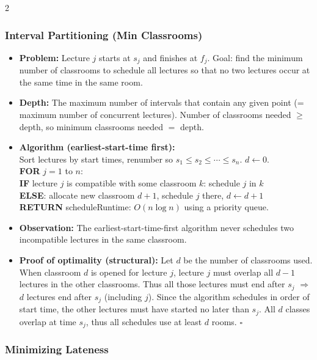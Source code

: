 \documentclass[9pt]{article}
\begin{document}
\begin{multicols}{2}
\subsubsection*{Interval Partitioning (Min Classrooms)}

\begin{itemize}
  \item \textbf{Problem:} Lecture $j$ starts at $s_j$ and finishes at $f_j$. Goal: find the minimum number of classrooms to schedule all lectures so that no two lectures occur at the same time in the same room.
  \item \textbf{Depth:} The maximum number of intervals that contain any given point (= maximum number of concurrent lectures). Number of classrooms needed $\ge$ depth, so minimum classrooms needed $=$ depth.
  \item \textbf{Algorithm (earliest-start-time first):}\\
  Sort lectures by start times, renumber so $s_1\le s_2\le\cdots\le s_n$. $d\leftarrow0$.\\
  \textbf{FOR} $j=1$ to $n$:\\
  \hspace*{8pt}\textbf{IF} lecture $j$ is compatible with some classroom $k$: schedule $j$ in $k$\\
  \hspace*{8pt}\textbf{ELSE}: allocate new classroom $d+1$, schedule $j$ there, $d\leftarrow d+1$\\
  \textbf{RETURN} schedule\quad Runtime: $O(n\log n)$ using a priority queue.
  \item \textbf{Observation:} The earliest-start-time-first algorithm never schedules two incompatible lectures in the same classroom.
  \item \textbf{Proof of optimality (structural):} Let $d$ be the number of classrooms used. When classroom $d$ is opened for lecture $j$, lecture $j$ must overlap all $d-1$ lectures in the other classrooms. Thus all those lectures must end after $s_j$ $\Rightarrow$ $d$ lectures end after $s_j$ (including $j$). Since the algorithm schedules in order of start time, the other lectures must have started no later than $s_j$. All $d$ classes overlap at time $s_j$, thus all schedules use at least $d$ rooms. $\square$
\end{itemize}

\subsubsection*{Minimizing Lateness}


\end{multicols}
\end{document}

